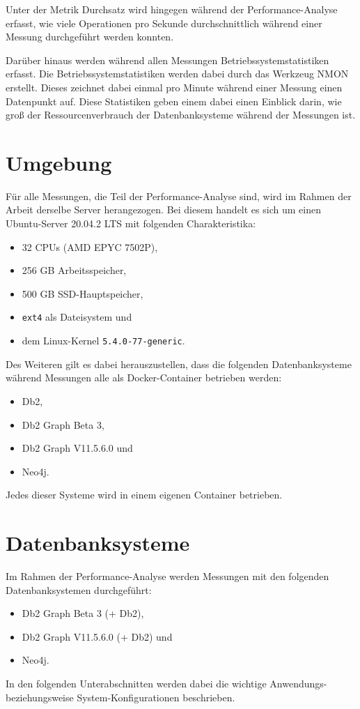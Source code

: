 Unter der Metrik Durchsatz wird hingegen während der Performance-Analyse erfasst, wie viele Operationen pro Sekunde durchschnittlich während einer Messung durchgeführt werden konnten. 

Darüber hinaus werden während allen Messungen  Betriebssystemstatistiken erfasst. Die Betriebssystemstatistiken werden dabei durch das Werkzeug NMON erstellt. Dieses zeichnet dabei einmal pro Minute während einer Messung einen Datenpunkt auf. Diese Statistiken geben einem dabei einen Einblick darin, wie groß der Ressourcenverbrauch der Datenbanksysteme während der Messungen ist.

\section{Umgebung}
\label{analyse:umgebung}
Für alle Messungen, die Teil der Performance-Analyse sind, wird im Rahmen der Arbeit derselbe Server herangezogen. Bei diesem handelt es sich um einen Ubuntu-Server 20.04.2 LTS mit folgenden Charakteristika:
\begin{itemize}
    \item 32 CPUs (AMD EPYC 7502P), 
    \item 256 GB Arbeitsspeicher,
    \item 500 GB SSD-Hauptspeicher,
    \item \texttt{ext4} als Dateisystem und 
    \item dem Linux-Kernel \texttt{5.4.0-77-generic}.
\end{itemize}
Des Weiteren gilt es dabei herauszustellen, dass die folgenden Datenbanksysteme während Messungen alle als Docker-Container betrieben werden: 
\begin{itemize}
    \item Db2,
    \item Db2 Graph Beta 3,
    \item Db2 Graph V11.5.6.0 und 
    \item Neo4j. 
\end{itemize}
Jedes dieser Systeme wird in einem eigenen Container betrieben. 

\section{Datenbanksysteme}
\label{analyse:datanbanksysteme}
Im Rahmen der Performance-Analyse werden Messungen mit den folgenden Datenbanksystemen durchgeführt: 
\begin{itemize}
    \item Db2 Graph Beta 3 (+ Db2),
    \item Db2 Graph V11.5.6.0 (+ Db2) und
    \item Neo4j.
\end{itemize}
In den folgenden Unterabschnitten werden dabei die wichtige Anwendungs- be\-zieh\-ungs\-wei\-se System-Konfigurationen beschrieben. 

